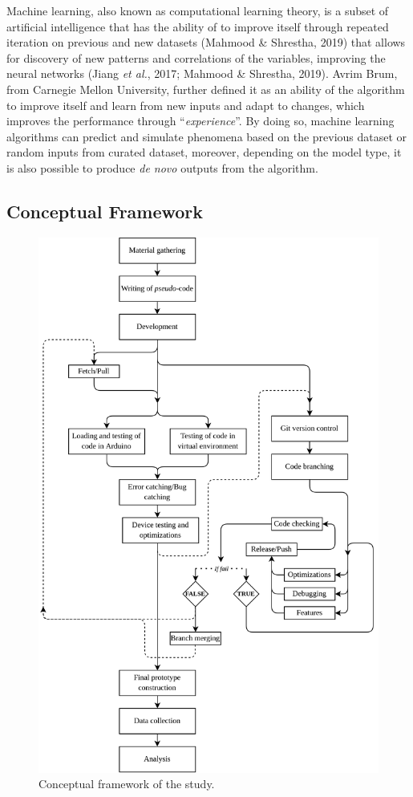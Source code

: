 \documentclass[12pt]{article}
\newcommand{\etl}{\textit{et al.}}
\begin{document}
Machine learning, also known as computational learning theory, is a subset of artificial intelligence that has the ability of to improve itself through repeated iteration on previous and new datasets (Mahmood \& Shrestha, 2019) that allows for discovery of new patterns and correlations of the variables, improving the neural networks (Jiang \etl, 2017; Mahmood \& Shrestha, 2019). Avrim Brum, from Carnegie Mellon University, further defined it as an ability of the algorithm to improve itself and learn from new inputs and adapt to changes, which improves the performance through ``\textit{experience}''. By doing so, machine learning algorithms can predict and simulate phenomena based on the previous dataset or random inputs from curated dataset, moreover, depending on the model type, it is also possible to produce \textit{de novo} outputs from the algorithm.

\subsection*{Conceptual Framework\centering}

\begin{figure}[h!]
	\centering
	\includegraphics{cframework.png}
	\caption{Conceptual framework of the study.} \label{fig:1}
\end{figure}
\end{document}
